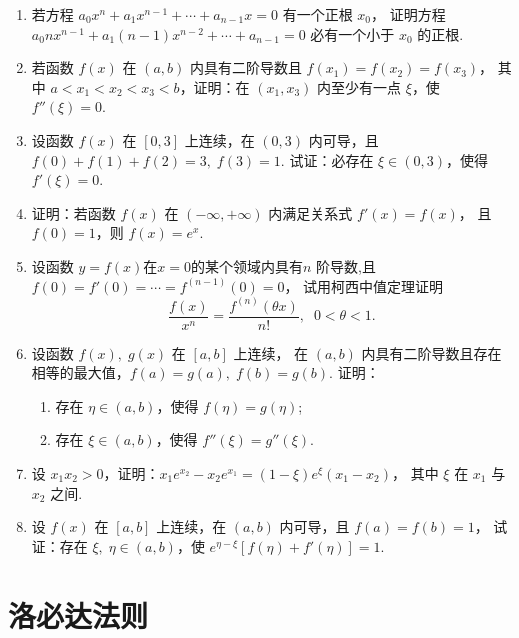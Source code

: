 \begin{enumerate}
    \item 若方程 $a_0x^n+a_1x^{n-1}+\cdots+a_{n-1}x=0$ 有一个正根 $x_0$，
    证明方程 $a_0nx^{n-1}+a_1(n-1)x^{n-2}+\cdots+a_{n-1}=0$ 必有一个小于 $x_0$ 的正根.

    \item 若函数 $f(x)$ 在 $(a,b)$ 内具有二阶导数且 $f(x_1)=f(x_2)=f(x_3)$，
    其中 $a<x_1<x_2<x_3<b$，证明：在 $(x_1,x_3)$ 内至少有一点 $\xi$，使 $f''(\xi)=0$.

    \item 设函数 $f(x)$ 在 $[0,3]$ 上连续，在 $(0,3)$ 内可导，且 $f(0)+f(1)+f(2)=3,\;f(3)=1$. 
    试证：必存在 $\xi\in(0,3)$，使得 $f'(\xi)=0$.

    \item 证明：若函数 $f(x)$ 在 $(-\infty,+\infty)$ 内满足关系式 $f'(x)=f(x)$，
    且 $f(0)=1$，则 $f(x)=e^x$.

    \item 设函数 $y=f(x)$在$x=0$的某个领域内具有$n$ 阶导数,且 $f(0)=f'(0)=\cdots=f^{(n-1)}(0)=0$，
    试用柯西中值定理证明
    \[
        \dfrac{f(x)}{x^n}=\dfrac{f^{(n)}(\theta x)}{n!},\;\;0<\theta<1.
    \]

    \item 设函数 $f(x),\;g(x)$ 在 $[a,b]$ 上连续，
    在 $(a,b)$ 内具有二阶导数且存在相等的最大值，$f(a)=g(a),\;f(b)=g(b)$. 
    证明：
    \begin{enumerate}[(1)]\setlength{\itemsep}{5pt}\setlength{\topsep}{15pt}
        \item 存在 $\eta\in(a,b)$，使得 $f(\eta)=g(\eta)$;
        \item 存在 $\xi\in(a,b)$，使得 $f''(\xi)=g''(\xi)$.
    \end{enumerate}
    
    \item 设 $x_1x_2>0$，证明：$x_1e^{x_2}-x_2e^{x_1}=(1-\xi)e^{\xi}(x_1-x_2)$，
    其中 $\xi$ 在 $x_1$ 与 $x_2$ 之间.

    \item 设 $f(x)$ 在 $[a,b]$ 上连续，在 $(a,b)$ 内可导，且 $f(a)=f(b)=1$，
    试证：存在 $\xi,\;\eta\in(a,b)$，使 $e^{\eta-\xi}[f(\eta)+f'(\eta)]=1$.
\end{enumerate}

\section{洛必达法则}

